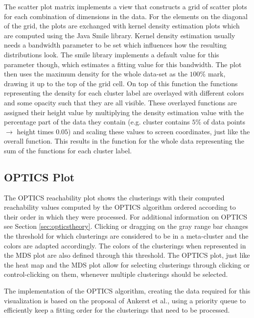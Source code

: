 \documentclass[
	a4paper,
	english,
	twoside,
	openright,               
	11pt                            
	]{report}
\begin{document}
The scatter plot matrix implements a view that constructs a grid of scatter plots for each combination of dimensions in the data. For the elements on the diagonal of the grid, the plots are exchanged with kernel density estimation plots which are computed using the Java Smile \cite{javasmile} library. Kernel density estimation usually needs a bandwidth parameter to be set which influences how the resulting distributions look. The smile library implements a default value for this parameter though, which estimates a fitting value for this bandwidth. The plot then uses the maximum density for the whole data-set as the $100\% $ mark, drawing it up to the top of the grid cell. On top of this function the functions representing the density for each cluster label are overlayed with different colors and some opacity such that they are all visible. These overlayed functions are assigned their height value by multiplying the density estimation value with the percentage part of the data they contain (e.g. cluster contains $5\% $ of data points $\rightarrow$ height times $0.05$) and scaling these values to screen coordinates, just like the overall function. This results in the function for the whole data representing the sum of the functions for each cluster label.

\subsection{OPTICS Plot}
The OPTICS reachability plot shows the clusterings with their computed reachability values computed by the OPTICS algorithm ordered according to their order in which they were processed. For additional information on OPTICS see Section \ref{sec:opticstheory}. Clicking or dragging on the gray range bar changes the threshold for which clusterings are considered to be in a meta-cluster and the colors are adapted accordingly. The colors of the clusterings when represented in the MDS plot are also defined through this threshold. The OPTICS plot, just like the heat map and the MDS plot allow for selecting clusterings through clicking or control-clicking on them, whenever multiple clusterings should be selected.

The implementation of the OPTICS algorithm, creating the data required for this visualization is based on the proposal of Ankerst et al., using a priority queue to efficiently keep a fitting order for the clusterings that need to be processed.
\end{document}
